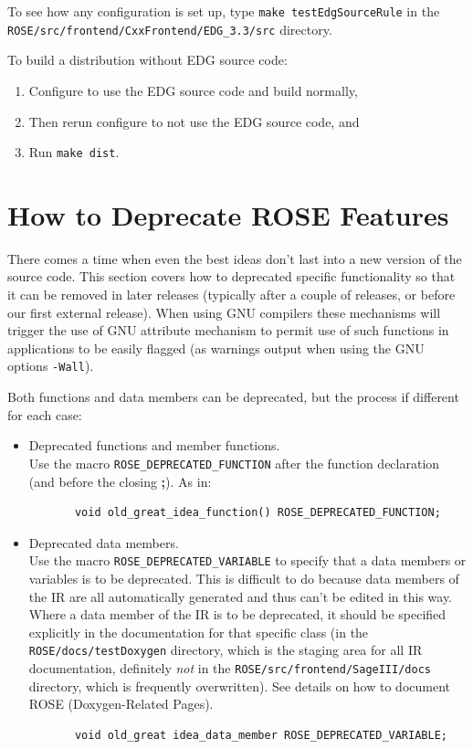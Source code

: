 To see how any configuration is set up, type {\tt make testEdgSourceRule}
in the {\tt ROSE/src/frontend/CxxFrontend/EDG\_3.3/src} directory.

To build a distribution without EDG source code:
\begin{enumerate}
   \item Configure to use the EDG source code and build normally, 
   \item Then rerun configure to not use the EDG source code, and
   \item Run {\tt make dist}.
\end{enumerate}

\section{How to Deprecate ROSE Features}%

    There comes a time when even the best ideas don't last
into a new version of the source code.  This section covers how to
deprecated specific functionality so that it can be removed in
later releases (typically after a couple of releases, or before
our first external release).  When using GNU compilers these mechanisms
will trigger the use of GNU attribute mechanism to permit use of such
functions in applications to be easily flagged (as warnings
output when using the GNU options {\tt -Wall}).

Both functions and data members can be deprecated, but the process if different 
for each case:
\begin{itemize}
    \item Deprecated functions and member functions. \\
          Use the macro {\tt ROSE\_DEPRECATED\_FUNCTION} after the function declaration (and before
          the closing {\bf ;}). As in:
{\indent
{\mySmallFontSize
\begin{verbatim}
       void old_great_idea_function() ROSE_DEPRECATED_FUNCTION;
\end{verbatim}
}}

    \item Deprecated data members. \\
        Use the macro {\tt ROSE\_DEPRECATED\_VARIABLE} to specify that a data members 
    or variables is to be deprecated.  This is difficult to do because data members of 
    the IR are all automatically generated and thus can't be edited in this way.  Where 
    a data member of the IR is to be deprecated, it should be specified explicitly in
    the documentation for that specific class (in the {\tt ROSE/docs/testDoxygen} directory,
    which is the staging area for all IR documentation, definitely {\em not} in the 
    {\tt ROSE/src/frontend/SageIII/docs} directory, which is frequently overwritten).  See
    details on how to document ROSE (Doxygen-Related Pages).
{\indent
{\mySmallFontSize
\begin{verbatim}
       void old_great idea_data_member ROSE_DEPRECATED_VARIABLE;
\end{verbatim} 
}}
\end{itemize}

